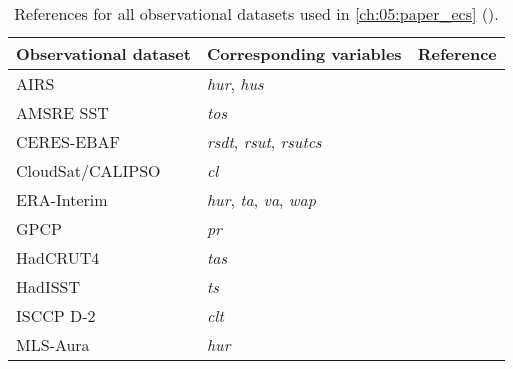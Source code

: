\begin{table}[!b]
  \centering
  \begin{tabulary}{\columnwidth}{L L L}
    \toprule
    Observational dataset & Corresponding variables & Reference \\
    \midrule
    AIRS & \emph{hur}, \emph{hus} & \textcite{Aumann2003} \\
    AMSRE SST & \emph{tos} & \textcite{AMSRE2011} \\
    CERES-EBAF & \emph{rsdt}, \emph{rsut}, \emph{rsutcs} & \textcite{Loeb2018}
    \\
    CloudSat/CALIPSO & \emph{cl} & \textcite{Mace2009} \\
    ERA-Interim & \emph{hur}, \emph{ta}, \emph{va}, \emph{wap} &
    \textcite{Dee2011} \\
    GPCP & \emph{pr} & \textcite{Adler2003} \\
    HadCRUT4 & \emph{tas} & \textcite{Morice2012} \\
    HadISST & \emph{ts} & \textcite{Rayner2003} \\
    ISCCP D-2 & \emph{clt} & \textcite{Rossow1991} \\
    MLS-Aura & \emph{hur} & \textcite{Beer2006} \\
    \bottomrule
  \end{tabulary}
  \caption{References for all observational datasets used in
    \cref{ch:05:paper_ecs} ().}
  \label{tab:app:a:observations}
\end{table}

